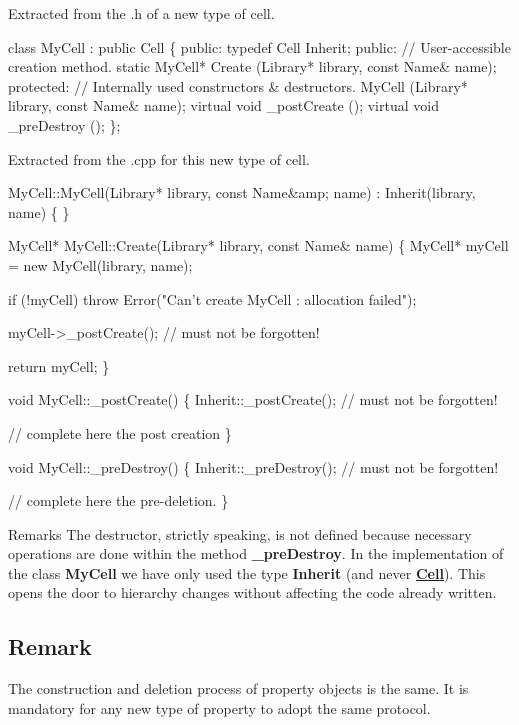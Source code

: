 Extracted from the .h of a new type of cell. 
\begin{DoxyCode}
\textcolor{keyword}{class }MyCell : \textcolor{keyword}{public} Cell \{
  \textcolor{keyword}{public}:  
    \textcolor{keyword}{typedef}  Cell  Inherit;
  \textcolor{keyword}{public}:
    \textcolor{comment}{// User-accessible creation method.}
    \textcolor{keyword}{static}  MyCell* Create      (Library* library, \textcolor{keyword}{const} Name& name);
  \textcolor{keyword}{protected}:
    \textcolor{comment}{// Internally used constructors & destructors. }
                    MyCell      (Library* library, \textcolor{keyword}{const} Name& name);
    \textcolor{keyword}{virtual} \textcolor{keywordtype}{void}    \_postCreate ();
    \textcolor{keyword}{virtual} \textcolor{keywordtype}{void}    \_preDestroy ();
\};
\end{DoxyCode}
 Extracted from the .cpp for this new type of cell. 
\begin{DoxyCode}
MyCell::MyCell(Library* library, \textcolor{keyword}{const} Name&amp; name)
  : Inherit(library, name)
\{ \}
 

MyCell* MyCell::Create(Library* library, \textcolor{keyword}{const} Name& name)
\{
  MyCell* myCell = \textcolor{keyword}{new} MyCell(library, name);
 
  \textcolor{keywordflow}{if} (!myCell) \textcolor{keywordflow}{throw} Error(\textcolor{stringliteral}{"Can't create MyCell : allocation failed"});
 
  myCell->\_postCreate(); \textcolor{comment}{// must not be forgotten!}
 
  \textcolor{keywordflow}{return} myCell;
\}
 

\textcolor{keywordtype}{void}  MyCell::\_postCreate()
\{
   Inherit::\_postCreate(); \textcolor{comment}{// must not be forgotten!}
 
   \textcolor{comment}{// complete here the post creation}
\}
 

\textcolor{keywordtype}{void}  MyCell::\_preDestroy()
\{
   Inherit::\_preDestroy(); \textcolor{comment}{// must not be forgotten!}
 
   \textcolor{comment}{// complete here the pre-deletion.}
\}
\end{DoxyCode}


\begin{DoxyRemark}{Remarks}
The destructor, strictly speaking, is not defined because necessary operations are done within the method {\bfseries \+\_\+pre\+Destroy}. In the implementation of the class {\bfseries My\+Cell} we have only used the type {\bfseries Inherit} (and never {\bfseries \mbox{\hyperlink{classHurricane_1_1Cell}{Cell}}}). This opens the door to hierarchy changes without affecting the code already written.
\end{DoxyRemark}
\hypertarget{classHurricane_1_1DBo_sDBoRemark}{}\subsection{Remark}\label{classHurricane_1_1DBo_sDBoRemark}
The construction and deletion process of property objects is the same. It is mandatory for any new type of property to adopt the same protocol. 

